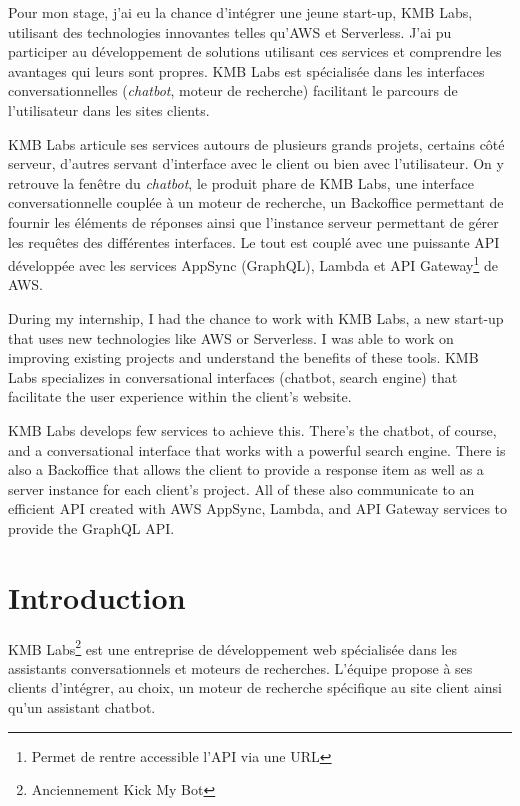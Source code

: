 \documentclass[12pt,a4paper,oneside]{scrreprt}
\newenvironment{abstractpage}
{\cleardoublepage\vspace*{\fill}\thispagestyle{empty}}
{\vfill\cleardoublepage}
\renewenvironment{abstract}[1]
{\bigskip\selectlanguage{#1}%
	\begin{center}\bfseries\abstractname\end{center}}
{\par\bigskip}
\begin{document}
\begin{abstractpage}
	\begin{abstract}{french}
		Pour mon stage, j'ai eu la chance d'intégrer une jeune start-up, KMB Labs, utilisant des technologies innovantes telles qu'AWS et Serverless. J'ai pu participer au développement de solutions utilisant ces services et comprendre les avantages qui leurs sont propres. KMB Labs est spécialisée dans les interfaces conversationnelles (\textit{chatbot}, moteur de recherche) facilitant le parcours de l'utilisateur dans les sites clients.

		KMB Labs articule ses services autours de plusieurs grands projets, certains côté serveur, d'autres servant d'interface avec le client ou bien avec l'utilisateur. On y retrouve la fenêtre du \textit{chatbot}, le produit phare de KMB Labs, une interface conversationnelle couplée à un moteur de recherche, un Backoffice permettant de fournir les éléments de réponses ainsi que l'instance serveur permettant de gérer les requêtes des différentes interfaces. Le tout est couplé avec une puissante API développée avec les services AppSync (GraphQL), Lambda et API Gateway\footnote{Permet de rentre accessible l'API via une URL} de AWS.
	\end{abstract}

	\begin{abstract}{english}
		During my internship, I had the chance to work with KMB Labs, a new start-up that uses new technologies like AWS or Serverless. I was able to work on improving existing projects and understand the benefits of these tools. KMB Labs specializes in conversational interfaces (chatbot, search engine) that facilitate the user experience within the client's website.

		KMB Labs develops few services to achieve this. There's the chatbot, of course, and a conversational interface that works with a powerful search engine. There is also a Backoffice that allows the client to provide a response item as well as a server instance for each client's project. All of these also communicate to an efficient API created with AWS AppSync, Lambda, and API Gateway services to provide the GraphQL API.
	\end{abstract}
\end{abstractpage}


\chapter*{Introduction}
KMB Labs\footnote{Anciennement Kick My Bot} est une entreprise de développement web spécialisée dans les assistants conversationnels et moteurs de recherches. L'équipe propose à ses clients d'intégrer, au choix, un moteur de recherche spécifique au site client ainsi qu'un assistant chatbot.
\end{document}
